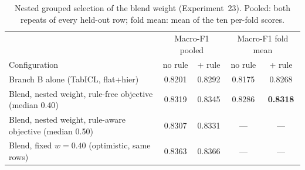 \begin{table}[t]
\caption{Nested grouped selection of the blend weight (Experiment~23). Pooled: both
repeats of every held-out row; fold mean: mean of the ten per-fold scores.}
\label{tab:t3-nested}
\centering
\begin{tabular}{lcccc}
\hline
 & \multicolumn{2}{c}{Macro-F1 pooled} & \multicolumn{2}{c}{Macro-F1 fold mean} \\
Configuration & no rule & + rule & no rule & + rule \\
\hline
Branch B alone (TabICL, flat+hier) & 0.8201 & 0.8292 & 0.8175 & 0.8268 \\
Blend, nested weight, rule-free objective (median 0.40) & 0.8319 & 0.8345 & 0.8286 & \textbf{0.8318} \\
Blend, nested weight, rule-aware objective (median 0.50) & 0.8307 & 0.8331 & --- & --- \\
Blend, fixed $w=0.40$ (optimistic, same rows) & 0.8363 & 0.8366 & --- & --- \\
\hline
\end{tabular}
\end{table}
 
